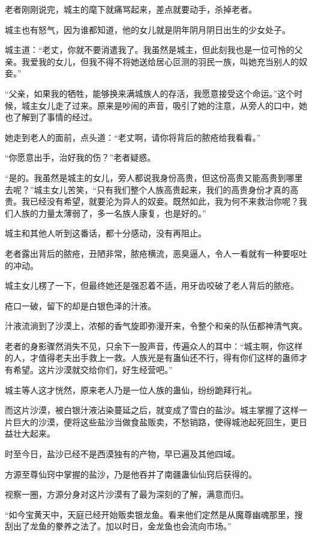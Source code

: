 \begin{this_body}
老者刚刚说完，城主的麾下就痛骂起来，差点就要动手，杀掉老者。

城主也有怒气，因为谁都知道，他的女儿就是阴年阴月阴日出生的少女处子。

城主道：“老丈，你就不要消遣我了。我虽然是城主，但此刻我也是一位可怜的父亲。我爱我的女儿，但我不得不将她送给居心叵测的羽民一族，叫她充当别人的奴妾。”

“父亲，如果我的牺牲，能够换来满城族人的存活，我愿意接受这个命运。”这个时候，城主女儿走了过来。原来是吵闹的声音，吸引了她的注意，从旁人的口中，她也了解到了事情的经过。

她走到老人的面前，点头道：“老丈啊，请你将背后的脓疮给我看看。”

“你愿意出手，治好我的伤？”老者疑惑。

“是的。我虽然是城主的女儿，旁人都说我身份高贵，但这份高贵又能高贵到哪里去呢？”城主女儿苦笑，“只有我们整个人族高贵起来，我们的高贵身份才真的高贵。我已经没有希望，就要沦为异人的奴妾。既然如此，我为何不来救治你呢？我们人族的力量太薄弱了，多一名族人康复，也是好的。”

城主和其他人听到这番话，都十分感动，没有再阻止。

老者露出背后的脓疮，丑陋非常，脓疮横流，恶臭逼人，令人一看就有一种要呕吐的冲动。

城主女儿楞了一下，但最终她还是强忍着不适，用牙齿咬破了老人背后的脓疮。

疮口一破，留下的却是白银色泽的汁液。

汁液流淌到了沙漠上，浓郁的香气旋即弥漫开来，令整个和亲的队伍都神清气爽。

老者的身影骤然消失不见，只余下一股声音，传遍众人的耳中：“城主啊，你这样的人，才值得老夫出手救上一救。人族光是有蛊仙还不行，得有你们这样的蛊师才有希望。这片沙漠就交给你们，好生经营吧。”

城主等人这才恍然，原来老人乃是一位人族的蛊仙，纷纷跪拜行礼。

而这片沙漠，被白银汁液沾染蔓延之后，就变成了雪白的盐沙。城主掌握了这样一片巨大的沙漠，便将这些盐沙当做食盐贩卖，不愁销路，使得城池起死回生，更日益壮大起来。

时至今日，盐沙已经不是西漠独有的产物，早已遍及其他四域。

方源至尊仙窍中掌握的盐沙，乃是他吞并了南疆蛊仙仙窍后获得的。

视察一圈，方源分身对这片沙漠有了最为深刻的了解，满意而归。

“如今宝黄天中，天庭已经开始贩卖银龙鱼。看来他们定然是从魔尊幽魂那里，搜刮出了龙鱼的豢养之法了。加以时日，金龙鱼也会流向市场。”


\end{this_body}
